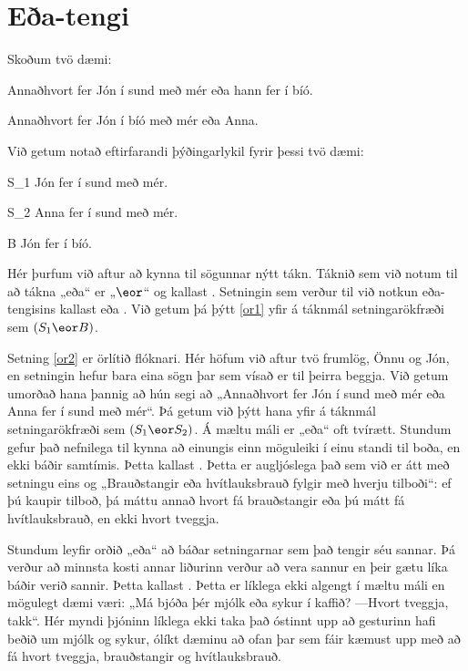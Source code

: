 \section{Eða-tengi}
Skoðum tvö dæmi:
	\begin{earg}
		\item[\ex{or1}]Annaðhvort fer Jón í sund með mér eða hann fer í bíó.
		\item[\ex{or2}]Annaðhvort fer Jón í bíó með mér eða Anna. 
	\end{earg}
Við getum notað eftirfarandi þýðingarlykil fyrir þessi tvö dæmi:
	\begin{ekey}
		\item[S_1] Jón fer í sund með mér.
		\item[S_2] Anna fer í sund með mér.
		\item[B] Jón fer í bíó.
	\end{ekey}	
Hér þurfum við aftur að kynna til sögunnar nýtt tákn. Táknið sem við notum til að tákna „eða“ er „$\eor$“ og kallast . Setningin sem verður til við notkun eða-tengisins kallast  eða . Við getum þá þýtt \ref{or1} yfir á táknmál setningarökfræði sem $(S_1 \eor B)$.

Setning \ref{or2} er örlítið flóknari. Hér höfum við aftur tvö frumlög, Önnu og Jón, en setningin hefur bara eina sögn þar sem vísað er til þeirra beggja. Við getum umorðað hana þannig að hún segi að „Annaðhvort fer Jón í sund með mér eða Anna fer í sund með mér“. Þá getum við þýtt hana yfir á táknmál setningarökfræði sem $(S_1 \eor S_2)$.
Á mæltu máli er „eða“ oft tvírætt. Stundum gefur það nefnilega til kynna að einungis einn möguleiki í einu standi til boða, en ekki báðir samtímis. Þetta kallast . Þetta er augljóslega það sem við er átt með setningu eins og „Brauðstangir eða hvítlauksbrauð fylgir með hverju tilboði“: ef þú kaupir tilboð, þá máttu annað hvort fá brauðstangir eða þú mátt fá hvítlauksbrauð, en ekki hvort tveggja. 	

Stundum leyfir orðið „eða“ að báðar setningarnar sem það tengir séu sannar. Þá verður að minnsta kosti annar liðurinn verður að vera sannur en þeir gætu líka báðir verið sannir. Þetta kallast . Þetta er líklega ekki algengt í mæltu máli en mögulegt dæmi væri: „Má bjóða þér mjólk eða sykur í kaffið? ---Hvort tveggja, takk“. Hér myndi þjóninn líklega ekki taka það óstinnt upp að gesturinn hafi beðið um mjólk og sykur, ólíkt dæminu að ofan þar sem fáir kæmust upp með að fá hvort tveggja, brauðstangir og hvítlauksbrauð. 

